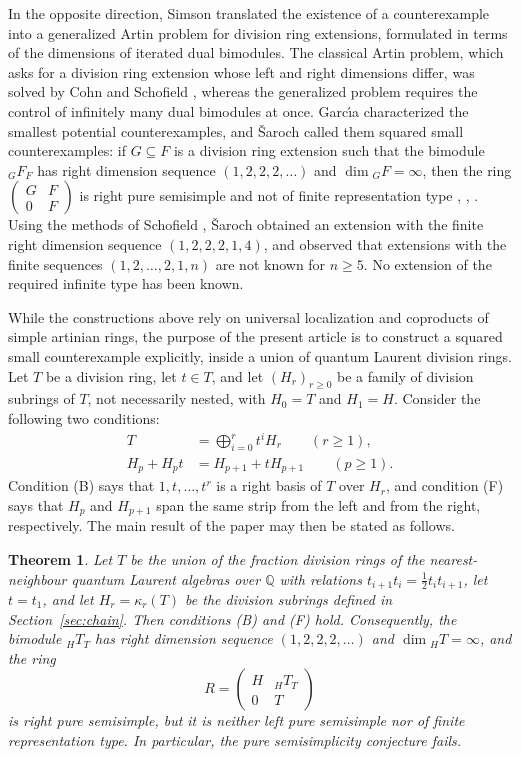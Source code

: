 \documentclass[11pt,a4paper]{amsart}
\newtheorem{theorem}{Theorem}[section]
\numberwithin{equation}{section}
\newcommand{\Q}{\mathbb{Q}}
\begin{document}
In the opposite direction, Simson \cite{Si95,Si97,Si00} translated the existence of a counterexample into a generalized Artin problem for division ring extensions, formulated in terms of the dimensions of iterated dual bimodules. The classical Artin problem, which asks for a division ring extension whose left and right dimensions differ, was solved by Cohn \cite{Co} and Schofield \cite{Sc85}, whereas the generalized problem requires the control of infinitely many dual bimodules at once. Garc\'{\i}a \cite{Ga14,Ga18} characterized the smallest potential counterexamples, and \v{S}aroch \cite{Sa} called them squared small counterexamples: if $G\subseteq F$ is a division ring extension such that the bimodule ${}_GF_F$ has right dimension sequence $(1,2,2,2,\dots)$ and $\dim{}_GF=\infty$, then the ring $\left(\begin{smallmatrix}G&F\\0&F\end{smallmatrix}\right)$ is right pure semisimple and not of finite representation type \cite{Si97}, \cite[Section 6]{Ga18}, \cite[Section 1]{Sa}. Using the methods of Schofield \cite{Sc85,Sc87}, \v{S}aroch \cite{Sa} obtained an extension with the finite right dimension sequence $(1,2,2,2,1,4)$, and observed that extensions with the finite sequences $(1,2,\dots,2,1,n)$ are not known for $n\ge5$. No extension of the required infinite type has been known.

While the constructions above rely on universal localization and coproducts of simple artinian rings, the purpose of the present article is to construct a squared small counterexample explicitly, inside a union of quantum Laurent division rings. Let $T$ be a division ring, let $t\in T$, and let $(H_r)_{r\ge0}$ be a family of division subrings of $T$, not necessarily nested, with $H_0=T$ and $H_1=H$. Consider the following two conditions:
\begin{align}
T&=\textstyle\bigoplus_{i=0}^{r}t^iH_r\qquad(r\ge1),\tag{B}\\
H_p+H_pt&=H_{p+1}+tH_{p+1}\qquad(p\ge1).\tag{F}
\end{align}
Condition (B) says that $1,t,\dots,t^r$ is a right basis of $T$ over $H_r$, and condition (F) says that $H_p$ and $H_{p+1}$ span the same strip from the left and from the right, respectively. The main result of the paper may then be stated as follows.

\begin{theorem}\label{thm:main}
Let $T$ be the union of the fraction division rings of the nearest-neighbour quantum Laurent algebras over $\Q$ with relations $t_{i+1}t_i=\frac12t_it_{i+1}$, let $t=t_1$, and let $H_r=\kappa_r(T)$ be the division subrings defined in Section~\ref{sec:chain}. Then conditions \textup{(B)} and \textup{(F)} hold. Consequently, the bimodule ${}_HT_T$ has right dimension sequence $(1,2,2,2,\dots)$ and $\dim{}_HT=\infty$, and the ring
\[
R=\begin{pmatrix}H&{}_HT_T\\0&T\end{pmatrix}
\]
is right pure semisimple, but it is neither left pure semisimple nor of finite representation type. In particular, the pure semisimplicity conjecture fails.
\end{theorem}
\end{document}
